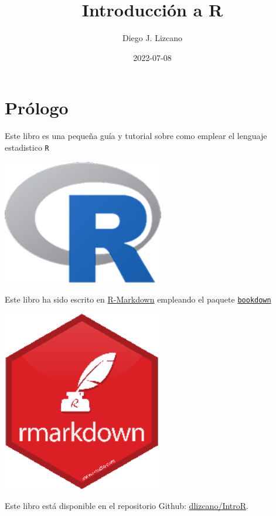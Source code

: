 \documentclass[
]{book}
\title{Introducción a R}
\author{Diego J. Lizcano}
\date{2022-07-08}
\begin{document}
\maketitle

{
\setcounter{tocdepth}{1}
\tableofcontents
}
\hypertarget{pruxf3logo}{%
\chapter*{Prólogo}\label{pruxf3logo}}

Este libro es una pequeña guía y tutorial sobre como emplear el lenguaje estadistico \texttt{R}

\begin{flushleft}\includegraphics[width=2.78in]{images/R} \end{flushleft}

Este libro ha sido escrito en \href{http://rmarkdown.rstudio.com}{R-Markdown} empleando el paquete \href{https://bookdown.org/yihui/bookdown/}{\texttt{bookdown}}

\begin{flushleft}\includegraphics[width=2.78in]{images/rmd} \end{flushleft}

Este libro está disponible en el repositorio Github: \href{https://github.com/dlizcano/IntroR}{dlizcano/IntroR}.
\end{document}
